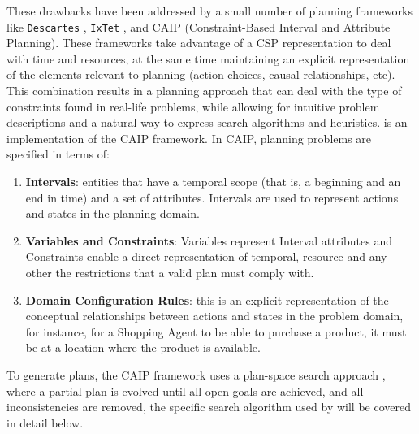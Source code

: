 These drawbacks have been addressed by a small number of planning
frameworks like \texttt{Descartes} \cite{joslin95,joslin96},
\texttt{IxTet} \cite{ghallab87,lemai04}, and CAIP (Constraint-Based
Interval and Attribute Planning)\cite{mus94,frank2003}.  These
frameworks take advantage of a CSP representation to deal with time
and resources, at the same time maintaining an explicit representation
of the elements relevant to planning (action choices, causal
relationships, etc). This combination results in a planning approach
that can deal with the type of constraints found in real-life
problems, while allowing for intuitive problem descriptions and a
natural way to express search algorithms and heuristics. \eu is an
implementation of the CAIP framework. In CAIP, planning problems are
specified in terms of:

\begin{enumerate}

\item \textbf{Intervals}: entities that have a temporal scope (that
  is, a beginning and an end in time) and a set of
  attributes. Intervals are used to represent actions and states in
  the planning domain.

\item \textbf{Variables and Constraints}: Variables represent Interval
  attributes and Constraints enable a direct representation of
  temporal, resource and any other the restrictions that a valid plan
  must comply with.

\item \textbf{Domain Configuration Rules}: this is an explicit
  representation of the conceptual relationships between actions and
  states in the problem domain, for instance, for a Shopping Agent to
  be able to purchase a product, it must be at a location where the
  product is available.
\end{enumerate}

To generate plans, the CAIP framework uses a plan-space search
approach \cite{ghallab04}, where a partial plan is evolved until all
open goals are achieved, and all inconsistencies are removed, the
specific search algorithm used by \eu will be covered in detail below.

